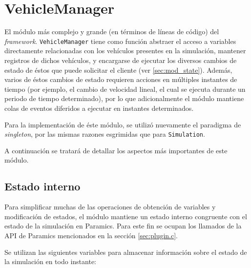 \section{VehicleManager}\label{sec:vehiclemanager}

El módulo más complejo y grande (en términos de líneas de código) del \emph{framework}. \texttt{VehicleManager} tiene como función abstraer el acceso a variables directamente relacionadas con los vehículos presentes en la simulación, mantener registros de dichos vehículos, y encargarse de ejecutar los diversos cambios de estado de éstos que puede solicitar el cliente (ver \ref{sec:mod_state}). Además, varios de éstos cambios de estado requieren acciones en múltiples instantes de tiempo (por ejemplo, el cambio de velocidad lineal, el cual se ejecuta durante un periodo de tiempo determinado), por lo que adicionalmente el módulo mantiene colas de eventos diferidos a ejecutar en instantes determinados.

Para la implementación de éste módulo, se utilizó nuevamente el paradigma de \emph{singleton}, por las mismas razones esgrimidas que para \texttt{Simulation}.

A continuación se tratará de detallar los aspectos más importantes de este módulo.

\subsection{Estado interno}\label{sec:internalstate}

Para simplificar muchas de las operaciones de obtención de variables y modificación de estados, el módulo mantiene un estado interno congruente con el estado de la simulación en Paramics. Para este fin se ocupan los llamados de la API de Paramics mencionados en la sección \ref{sec:plugin.c}.

Se utilizan las siguientes variables para almacenar información sobre el estado de la simulación en todo instante:

